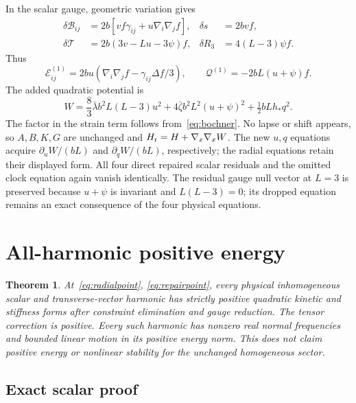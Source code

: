 \documentclass[11pt]{article}
\newtheorem{theorem}{Theorem}
\numberwithin{equation}{section}
\begin{document}
In the scalar gauge, geometric variation gives
\begin{align}
 \delta\mathcal B_{ij}&=2b[vf\gamma_{ij}+u\nabla_i\nabla_jf],&\delta s&=2bvf,\\
 \delta\mathcal T&=2b(3v-Lu-3\psi)f,&\delta R_3&=4(L-3)\psi f.
\end{align}
Thus
\begin{equation}
 \mathcal E^{(1)}_{ij}=2bu(\nabla_i\nabla_jf-\gamma_{ij}\Delta f/3),\qquad
 \mathcal Q^{(1)}=-2bL(u+\psi)f.
\end{equation}
The added quadratic potential is
\begin{equation}
 W=\frac83\bar\lambda b^2L(L-3)u^2+4\bar\zeta b^2L^2(u+\psi)^2+\tfrac12bLh_*q^2.
 \label{eq:W}
\end{equation}
The factor in the strain term follows from~\eqref{eq:bochner}.
No lapse or shift appears, so $A,B,K,G$ are unchanged and $H_{\rm r}=H+\nabla_x\nabla_xW$.
The new $u,q$ equations acquire $\partial_uW/(bL)$ and $\partial_qW/(bL)$, respectively; the radial equations retain their displayed form.
All four direct repaired scalar residuals and the omitted clock equation again vanish identically.
The residual gauge null vector at $L=3$ is preserved because $u+\psi$ is invariant and $L(L-3)=0$; its dropped equation remains an exact consequence of the four physical equations.

\section{All-harmonic positive energy}
\label{sec:positive}

\begin{theorem}
\label{thm:positive}
At~\eqref{eq:radialpoint}, \eqref{eq:repairpoint}, every physical inhomogeneous scalar and transverse-vector harmonic has strictly positive quadratic kinetic and stiffness forms after constraint elimination and gauge reduction.
The tensor correction is positive.
Every such harmonic has nonzero real normal frequencies and bounded linear motion in its positive energy norm.
This does not claim positive energy or nonlinear stability for the unchanged homogeneous sector.
\end{theorem}

\subsection{Exact scalar proof}
\end{document}
